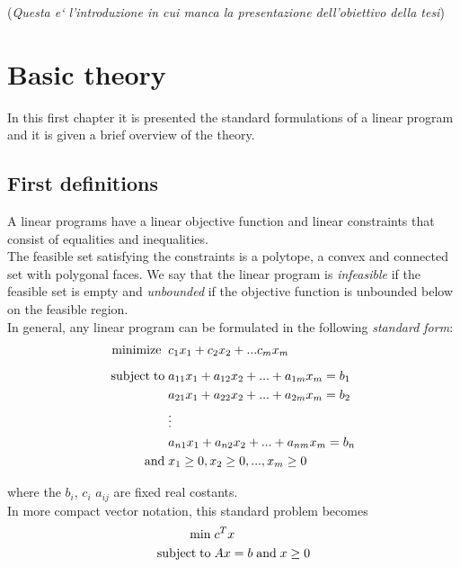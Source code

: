 \documentclass[a4paper,10 pt,titlepage,twoside]{book}
\theoremstyle{plain}
\theoremstyle{definition}
\theoremstyle{remark}
\begin{document}
(\textit{Questa e` l'introduzione in cui manca la presentazione dell'obiettivo della tesi})
%
\chapter{Basic theory}

In this first chapter it is presented the standard formulations of a linear program and it is given a brief overview of the theory. 
\section{First definitions}
A linear programs have a linear objective function and linear constraints that consist of equalities and inequalities.\\
The feasible set satisfying the constraints is a polytope, a convex and connected set with polygonal faces. We say that the linear program is \textit{infeasible} if the feasible set is empty and \textit{unbounded} if the objective function is unbounded below on the feasible region.\\
In general, any linear program can be formulated in the following \textit{standard form}:
\begin{alignat*}{1}\label{eq:stdform}
\text{minimize\;}\; &c_1 x_1 + c_2 x_2+ ... c_m x_m\\[2mm]
\text{subject\;to\;} &a_{11} x_1 + a_{12} x_2+ ... +a_{1m}x_m = b_1\\
&a_{21} x_1 + a_{22} x_2 + ... + a_{2m} x_m= b_2\\
&\vdots\\
&a_{n1} x_1 + a_{n2} x_2 + ... + a_{nm} x_m= b_n\\
\text{and}\; & x_1 \geq 0 , x_2 \geq 0, ... , x_m \geq 0
 \end{alignat*}


where the $b_{i}$, $c_{i}$  $a_{ij}$ are fixed real costants.\\ In more compact vector notation, this standard problem becomes 
\begin{equation}
 \begin{split}
\min\; &c^{T}x\\
\text{subject\;to\;}&Ax = b\;\text{and\;}x\geq0
 \end{split}
\end{equation}
\end{document}
